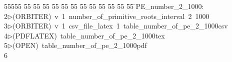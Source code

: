 %
%
\begin{tabbing}
55555 \= 55 \= 55 \= 55 \= 55 \= 55 \= 55 \= 55 \= 55 \= 55 \= 55 \= 55 \= 55 \= \>PE\_number\_2\_1000:\\[0pt]
2\>$\triangleright$\>(ORBITER)\ v\ 1\ number\_of\_primitive\_roots\_interval\ 2\ 1000\\[0pt]
3\>$\triangleright$\>(ORBITER)\ v\ 1\ csv\_file\_latex\ 1\ table\_number\_of\_pe\_2\_1000csv\\[0pt]
4\>$\triangleright$\>(PDFLATEX)\ table\_number\_of\_pe\_2\_1000tex\\[0pt]
5\>$\triangleright$\>(OPEN)\ table\_number\_of\_pe\_2\_1000pdf\\[0pt]
6\>\end{tabbing}
